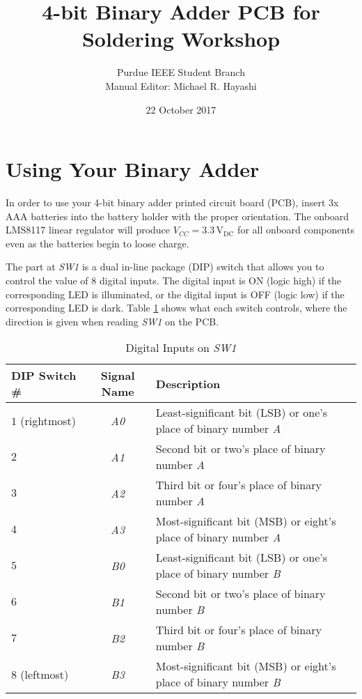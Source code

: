 \documentclass[11pt,oneside]{article}
\title{4-bit Binary Adder PCB for Soldering Workshop}
\author{Purdue IEEE Student Branch \\ Manual Editor: Michael R. Hayashi}
\date{22 October 2017}
\begin{document}
\maketitle
\tableofcontents

\section{Using Your Binary Adder}
In order to use your 4-bit binary adder printed circuit board (PCB), insert 3x AAA batteries into the battery holder with the proper orientation. The onboard LMS8117 linear regulator will produce $V_{CC} = 3.3 \, \mathrm{V_{DC}}$ for all onboard components even as the batteries begin to loose charge.

The part at \textit{SW1} is a dual in-line package (DIP) switch that allows you to control the value of 8 digital inputs. The digital input is ON (logic high) if the corresponding LED is illuminated, or the digital input is OFF (logic low) if the corresponding LED is dark. Table \ref{tab:dig_input} shows what each switch controls, where the direction is given when reading \textit{SW1} on the PCB.

\begin{table}[!htb]
	\centering
	\caption{Digital Inputs on \textit{SW1}}
	\begin{tabular}{l | c | l}
		\hline
		DIP Switch \# & Signal Name & Description \\
		\hline
		$1$ (rightmost) & \textit{A0} & Least-significant bit (LSB) or one's place of binary number \textit{A} \\
		$2$ & \textit{A1} & Second bit or two's place of binary number \textit{A} \\
		$3$ & \textit{A2} & Third bit or four's place of binary number \textit{A} \\
		$4$ & \textit{A3} & Most-significant bit (MSB) or eight's place of binary number \textit{A}  \\
		$5$ & \textit{B0} & Least-significant bit (LSB) or one's place of binary number \textit{B} \\
		$6$ & \textit{B1} & Second bit or two's place of binary number \textit{B} \\
		$7$ & \textit{B2} & Third bit or four's place of binary number \textit{B} \\
		$8$ (leftmost) & \textit{B3} & Most-significant bit (MSB) or eight's place of binary number \textit{B} \\
		\hline
	\end{tabular}
	\label{tab:dig_input}
\end{table}
\end{document}
